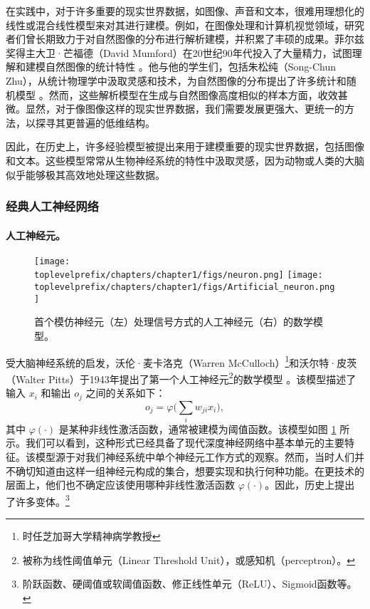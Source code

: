\documentclass[../../book-main.tex]{subfiles}
\begin{document}
在实践中，对于许多重要的现实世界数据，如图像、声音和文本，很难用理想化的线性或混合线性模型来对其进行建模。例如，在图像处理和计算机视觉领域，研究者们曾长期致力于对自然图像的分布进行解析建模，并积累了丰硕的成果。菲尔兹奖得主大卫·芒福德（David Mumford）在20世纪90年代投入了大量精力，试图理解和建模自然图像的统计特性 \cite{Mumford1996TheSD}。他与他的学生们，包括朱松纯（Song-Chun Zhu），从统计物理学中汲取灵感和技术，为自然图像的分布提出了许多统计和随机模型 \cite{Zhu-Entropy-1997,Zhu1997LearningGP,Zhu1997Prior,Huang-Mumford,Mumford-1999,Lee-Mumford}。然而，这些解析模型在生成与自然图像高度相似的样本方面，收效甚微。显然，对于像图像这样的现实世界数据，我们需要发展更强大、更统一的方法，以探寻其更普遍的低维结构。

因此，在历史上，许多经验模型被提出来用于建模重要的现实世界数据，包括图像和文本。这些模型常常从生物神经系统的特性中汲取灵感，因为动物或人类的大脑似乎能够极其高效地处理这些数据。

\subsubsection{经典人工神经网络}
\paragraph{人工神经元。}

\begin{figure}[t]
    \centering
\texttt{[image: \\toplevelprefix/chapters/chapter1/figs/neuron.png]} \hspace{3mm}   
\texttt{[image: \\toplevelprefix/chapters/chapter1/figs/Artificial\_neuron.png]}
    \caption{首个模仿神经元（左）处理信号方式的人工神经元（右）的数学模型。}
    \label{fig:neuron}
\end{figure}

受大脑神经系统的启发，沃伦·麦卡洛克（Warren McCulloch）\footnote{时任芝加哥大学精神病学教授}和沃尔特·皮茨（Walter Pitts）于1943年提出了第一个人工神经元\footnote{被称为线性阈值单元（Linear Threshold Unit），或感知机（perceptron）。}的数学模型 \cite{McCulloch-Pitts}。该模型描述了输入 $x_i$ 和输出 $o_j$ 之间的关系如下：
\begin{equation}
    o_j = \varphi\Big( \sum_i w_{ji}x_i\Big),  
\end{equation}
其中 $\varphi(\cdot)$ 是某种非线性激活函数，通常被建模为阈值函数。该模型如图 \ref{fig:neuron} 所示。我们可以看到，这种形式已经具备了现代深度神经网络中基本单元的主要特征。该模型源于对我们神经系统中单个神经元工作方式的观察。然而，当时人们并不确切知道由这样一组神经元构成的集合，想要实现和执行何种功能。在更技术的层面上，他们也不确定应该使用哪种非线性激活函数 $\varphi(\cdot)$。因此，历史上提出了许多变体。\footnote{阶跃函数、硬阈值或软阈值函数、修正线性单元（ReLU）、Sigmoid函数等。}
\end{document}
